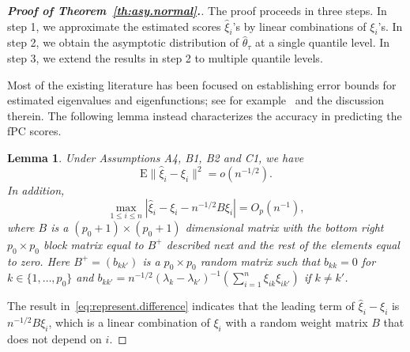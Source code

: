 \documentclass[times,sort&compress,3p]{elsarticle}
\theoremstyle{plain}%
\newtheorem{lemma}{Lemma}
\theoremstyle{definition}
\newcommand{\bB}{{B}}
\newcommand{\bxi}{{\xi}}
\begin{document}
\begin{proof}[\textbf{\upshape Proof of Theorem~\ref{th:asy.normal}.}] 
The proof proceeds in three steps. In step 1, we approximate the estimated scores $\widehat{\bxi}_i$'s by linear combinations of $\bxi_i$'s. In step 2, we obtain the asymptotic distribution of $\widehat{\theta}_{\tau}$ at a single quantile level. In step 3, we extend the results in step 2 to multiple quantile levels. 

Most of the existing literature has been focused on establishing error bounds for estimated eigenvalues and eigenfunctions; see for example~\cite{Hal+Hos:06, Hal:09} and the discussion therein. The following lemma instead characterizes the accuracy in predicting the fPC scores.  

\begin{lemma}
	\label{lemma:z.hat.z}
	Under Assumptions A4, B1, B2 and C1, we have 
	\begin{equation}
	\label{eq:z.hat.z.expectation}
	\text{E} \|\widehat{\bxi}_i - \bxi_{i} \|^2  = o(n^{-1/2}). 
	\end{equation}
	\color{black}
	In addition, 
	\begin{equation}
	\label{eq:represent.difference}
	\underset{1 \leq i \leq n}{\max} \left| \widehat{\bxi}_i - \bxi_{i} - n^{-1/2} B \bxi_{i} \right| = O_p(n^{-1}),
	\end{equation}
	\color{black}
	where $\bB$ is a $(p_0 + 1)\times(p_0 + 1)$ dimensional matrix with the bottom right $p_0\times p_0$ block matrix equal to $\bB^+$ described next and the rest of the elements equal to zero. Here $\bB^+ = (b_{kk'})$ is a $p_0 \times p_0$ random matrix such that $b_{kk} = 0$ for $k \in \{1, \ldots, p_0\}$ and $b_{kk'} =  n^{-1/2}(\lambda_k - \lambda_{k'})^{-1}  \left(\sum_{i = 1}^n \xi_{ik} \xi_{ik'}\right)$ if $k \neq k'$.  
\end{lemma}

The result in~\eqref{eq:represent.difference} indicates that the leading term of $\widehat{\bxi}_i - \bxi_{i}$ is $n^{-1/2} \bB \bxi_{i}$, which is a linear combination of $\bxi_i$ with a random weight matrix $\bB$ that does not depend on $i$. 


\end{proof}
\end{document}
